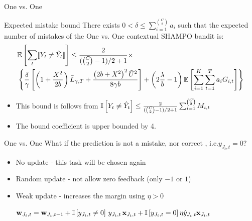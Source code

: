\documentclass{beamer}
\begin{document}
\begin{frame}{One vs. One}
\begin{block}{Expected mistake bound}
There exists $0<\delta\le \sum_{i=1}^{C \choose 2}a_{i}$ such that the  expected number of mistakes  of the One vs. One contextual SHAMPO bandit  is:
 \[
 \begin{split}
 &\mathbb{E}\left[{\sum_t [\![{Y_t \neq \hat{Y}_t}]\!]}\right]\le \frac{2}{({C \choose 2}-1)/2+1}\times\\
 &\left\{{ \frac{\delta}{\gamma}\left[{\left({1+\frac{X^2}{2b} }\right){\bar L}_{\gamma,T}+\frac{\left({{2b+X^2}}\right)^2\tilde{U}^{2}}{8{\gamma}b}}\right]+\left({2\frac{\lambda}{b}-1}\right)\mathbb{E}\left[{\sum_{i=1}^{K}\sum_{t=1}^{T}{a_{i}G_{i,t}}}\right]}\right\}
 \end{split}
 \]
\end{block}
\begin{itemize}

\item This bound is follows from $\mathbb{I}\left[{Y_t \neq \hat{Y}_t}\right] \leq \frac{2}{({C \choose 2}-1)/2+1}\sum_{i=1}^{ {C \choose 2}} M_{i,t}$\newline [Allwein et al., 2000]\newline
\item The bound coefficient is upper bounded by 4.
\end{itemize}
\end{frame}

\begin{frame}{One vs. One}
What if the prediction is not a mistake, nor correct , i.e.$y_{J_t,t}=0$?\newline
\begin{itemize}
\item No update -  this task will be chosen again\newline
\item Random update - not allow zero feedback (only $-1$ or $1$)\newline
\item Weak update - increases the margin using $\eta>0$\newline

$
\mathbf{w}_{J_t,t} = \mathbf{w}_{J_t,t-1}+ \mathbb{I}\left[{y_{J_t,t}\ne0}\right] \, y_{J_t,t}\, \mathbf{x}_{J_t,t} +
 \mathbb{I}\left[{y_{J_t,t}=0}\right] \eta \hat{y}_{J_t,t}\mathbf{x}_{J_t,t}~$
\newline
\end{itemize}
\end{frame}
\end{document}
